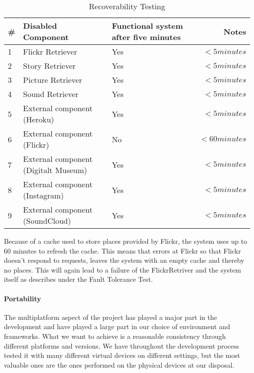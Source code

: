 \begin{table}[!htp]
\begin{center}
	\begin{tabular}{ | l | l | p{3.7cm} | r | }
	\hline
	\#	&Disabled Component	&Functional system  after five minutes	& Notes \\ \hline
	1	&Flickr Retriever		&Yes			& $<5 minutes$ \\ \hline
	2	&Story Retriever		&Yes			& $<5 minutes$\\ \hline
	3	&Picture Retriever	&Yes			& $<5 minutes$\\ \hline
	4	&Sound Retriever	&Yes			& $<5 minutes$\\ \hline
	5	&External component (Heroku)	&Yes			& $<5 minutes$\\ \hline
	6	&External component (Flickr)	&No			& $<60 minutes$\\ \hline
	7	&External component (Digitalt Museum)	&Yes		& $<5 minutes$\\ \hline
	8	&External component (Instagram)	&Yes			& $<5 minutes$\\ \hline
	9	&External component (SoundCloud)	&Yes			& $<5 minutes$\\ \hline
	 \hline
	 \end{tabular}
\end{center}
\caption{Recoverability Testing}
\label{tab:Recoverability Testing}
\end{table}

Because of a cache used to store places provided by Flickr, the system uses up to 60 minutes to refresh the cache. This means that errors at Flickr so that Flickr doesn't respond to requests, leaves the system with an empty cache and thereby no places. This will again lead to a failure of the FlickrRetriver and the system itself as describes under the Fault Tolerance Test. 

\paragraph{Portability}

The multiplatform aspect of the project has played a major part in the development and have played a large part in our choice of environment and frameworks. What we want to achieve is a reasonable consistency through different platforms and versions. We have throughout the development process tested it with many different virtual devices on different settings, but the most valuable ones are the ones performed on the physical devices at our disposal.\\

